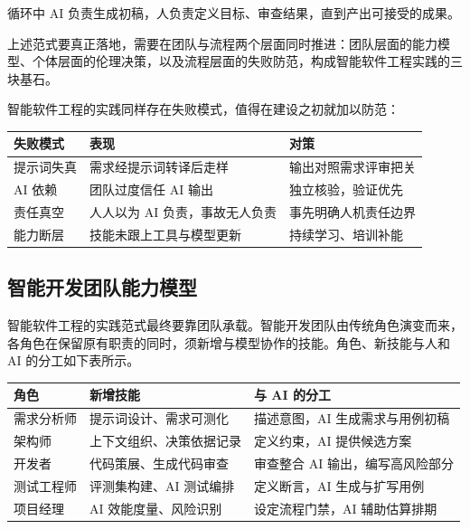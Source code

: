 \documentclass[12pt,a4paper,twoside,openany]{ctexbook}
\numberwithin{figure}{chapter}
\numberwithin{table}{chapter}
\newcounter{none}
\begin{document}
循环中 AI 负责生成初稿，人负责定义目标、审查结果，直到产出可接受的成果。

上述范式要真正落地，需要在团队与流程两个层面同时推进：团队层面的能力模型、个体层面的伦理决策，以及流程层面的失败防范，构成智能软件工程实践的三块基石。

智能软件工程的实践同样存在失败模式，值得在建设之初就加以防范：

{\def\LTcaptype{none} %
\begin{longtable}[]{@{}lll@{}}
\toprule\noalign{}
失败模式 & 表现 & 对策 \\
\midrule\noalign{}
\endhead
\bottomrule\noalign{}
\endlastfoot
提示词失真 & 需求经提示词转译后走样 & 输出对照需求评审把关 \\
AI 依赖 & 团队过度信任 AI 输出 & 独立核验，验证优先 \\
责任真空 & 人人以为 AI 负责，事故无人负责 & 事先明确人机责任边界 \\
能力断层 & 技能未跟上工具与模型更新 & 持续学习、培训补能 \\
\end{longtable}
}

\subsection{智能开发团队能力模型}\label{ux667aux80fdux5f00ux53d1ux56e2ux961fux80fdux529bux6a21ux578b}

智能软件工程的实践范式最终要靠团队承载。智能开发团队由传统角色演变而来，各角色在保留原有职责的同时，须新增与模型协作的技能。角色、新技能与人和
AI 的分工如下表所示。

{\def\LTcaptype{none} %
\begin{longtable}[]{@{}
  >{\raggedright\arraybackslash}p{}
  >{\raggedright\arraybackslash}p{}
  >{\raggedright\arraybackslash}p{}@{}}
\toprule\noalign{}
\begin{minipage}[b]{\linewidth}\raggedright
角色
\end{minipage} & \begin{minipage}[b]{\linewidth}\raggedright
新增技能
\end{minipage} & \begin{minipage}[b]{\linewidth}\raggedright
与 AI 的分工
\end{minipage} \\
\midrule\noalign{}
\endhead
\bottomrule\noalign{}
\endlastfoot
需求分析师 & 提示词设计、需求可测化 & 描述意图，AI 生成需求与用例初稿 \\
架构师 & 上下文组织、决策依据记录 & 定义约束，AI 提供候选方案 \\
开发者 & 代码策展、生成代码审查 & 审查整合 AI 输出，编写高风险部分 \\
测试工程师 & 评测集构建、AI 测试编排 & 定义断言，AI 生成与扩写用例 \\
项目经理 & AI 效能度量、风险识别 & 设定流程门禁，AI 辅助估算排期 \\
\end{longtable}
}
\end{document}
